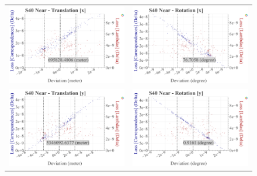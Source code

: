 \begin{figure}[!ht]
  \centering
  \begin{tabular}{cc}
    \includegraphics[width=0.45 \linewidth]{diagrams/calibration/s40_n_near/parameters.csv/Translation[x]_vs_Loss[Correspondences]_vs_Loss[Lambdas]_cluster_All.png} &
    \includegraphics[width=0.45 \linewidth]{diagrams/calibration/s40_n_near/parameters.csv/Rotation[x]_vs_Loss[Correspondences]_vs_Loss[Lambdas]_cluster_All.png} \\
    
    \includegraphics[width=0.45 \linewidth]{diagrams/calibration/s40_n_near/parameters.csv/Translation[y]_vs_Loss[Correspondences]_vs_Loss[Lambdas]_cluster_All.png} &
    \includegraphics[width=0.45 \linewidth]{diagrams/calibration/s40_n_near/parameters.csv/Rotation[y]_vs_Loss[Correspondences]_vs_Loss[Lambdas]_cluster_All.png} \\
    

\end{tabular}
\end{figure}
